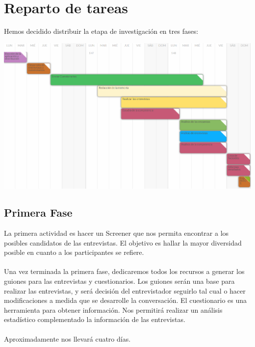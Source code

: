 \documentclass[12pt]{article}
\begin{document}
\section{Reparto de tareas}
Hemos decidido distribuir la etapa de investigación en tres fases:
\begin{center}
	\centering
	\includegraphics[width=1\textwidth]{planificacionHito1}
\end{center}
\subsection{Primera Fase}
La primera actividad es hacer un Screener que nos permita encontrar a los posibles candidatos de las entrevistas. El objetivo es hallar la mayor diversidad posible en cuanto a los participantes se refiere.
\\
\\
	Una vez terminada la primera fase, dedicaremos todos los recursos a generar los guiones para las entrevistas y cuestionarios. Los guiones serán una base para realizar las entrevistas, y será decisión del entrevistador seguirlo tal cual o hacer modificaciones a medida que se desarrolle la conversación. El cuestionario es una herramienta para obtener información. Nos permitirá realizar un análisis estadístico complementado la información de las entrevistas. 
\\
\\
	Aproximadamente nos llevará cuatro días.
\end{document}
